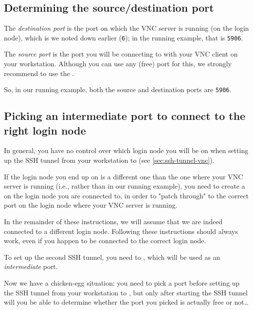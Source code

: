 \subsection{Determining the source/destination port}
\label{sec:source-port-vnc}

The \emph{destination port} is the port on which the VNC server is running (on the login node),
which is  we noted down earlier (\lstinline|6|);
in the running example, that is \lstinline|5906|.

The \emph{source port} is the port you will be connecting to with your VNC client on your workstation.
Although you can use any (free) port for this, we strongly recommend to use the .

So, in our running example, both the source and destination ports are \lstinline|5906|.

\subsection{Picking an intermediate port to connect to the right login node}
\label{sec:intermediate-port-vnc}

In general, you have no control over which login node you will be on when setting up the SSH tunnel from
your workstation to \texttt{\loginnode{}} (see \autoref{sec:ssh-tunnel-vnc}).

If the login node you end up on is a different one than the one where your VNC server is running
(i.e., \texttt{\altloginhost} rather than \texttt{\loginhost} in our running example),
you need to create a  on the login node you are connected to,
in order to "patch through" to the correct port on the login node where your VNC server is running.

In the remainder of these instructions, we will assume that we are indeed connected to a different login node.
Following these instructions should always work, even if you happen to be connected to the correct login node.

To set up the second SSH tunnel, you need to ,
which will be used as an \emph{intermediate} port.

Now we have a chicken-egg situation: you need to pick a port before setting up the SSH tunnel from your workstation
to \texttt{\loginhost}, but only after starting the SSH tunnel will you be able to determine whether the port you
picked is actually free or not\ldots


